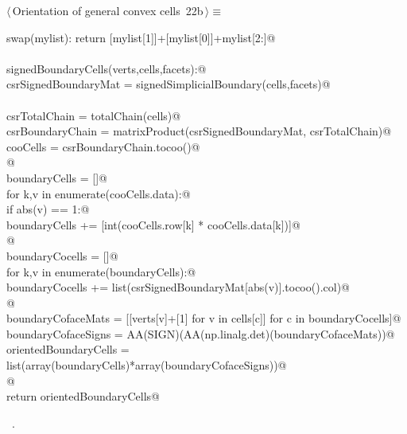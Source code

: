 \documentclass[11pt,oneside]{article}	%
\begin{document}
\begin{flushleft} \small \label{scrap39}
\protect{}$\langle\,$Orientation of general convex cells\nobreak\ {\footnotesize 22b}$\,\rangle\equiv$
\vspace{-1ex}
\begin{list}{}{} \item
\mbox{}\verb@def swap(mylist): return [mylist[1]]+[mylist[0]]+mylist[2:]@\\
\mbox{}\verb@@\\
\mbox{}\verb@def signedBoundaryCells(verts,cells,facets):@\\
\mbox{}\verb@   csrSignedBoundaryMat = signedSimplicialBoundary(cells,facets)@\\
\mbox{}\verb@@\\
\mbox{}\verb@   csrTotalChain = totalChain(cells)@\\
\mbox{}\verb@   csrBoundaryChain = matrixProduct(csrSignedBoundaryMat, csrTotalChain)@\\
\mbox{}\verb@   cooCells = csrBoundaryChain.tocoo()@\\
\mbox{}\verb@   @\\
\mbox{}\verb@   boundaryCells = []@\\
\mbox{}\verb@   for k,v in enumerate(cooCells.data):@\\
\mbox{}\verb@      if abs(v) == 1:@\\
\mbox{}\verb@         boundaryCells += [int(cooCells.row[k] * cooCells.data[k])]@\\
\mbox{}\verb@         @\\
\mbox{}\verb@   boundaryCocells = []@\\
\mbox{}\verb@   for k,v in enumerate(boundaryCells):@\\
\mbox{}\verb@      boundaryCocells += list(csrSignedBoundaryMat[abs(v)].tocoo().col)@\\
\mbox{}\verb@      @\\
\mbox{}\verb@   boundaryCofaceMats = [[verts[v]+[1] for v in cells[c]] for c in boundaryCocells]@\\
\mbox{}\verb@   boundaryCofaceSigns = AA(SIGN)(AA(np.linalg.det)(boundaryCofaceMats))@\\
\mbox{}\verb@   orientedBoundaryCells = list(array(boundaryCells)*array(boundaryCofaceSigns))@\\
\mbox{}\verb@   @\\
\mbox{}\verb@   return orientedBoundaryCells@\\
\mbox{}\verb@@{\NWsep}
\end{list}
\vspace{-1ex}
\footnotesize\addtolength{\baselineskip}{-1ex}
\begin{list}{}{\setlength{\itemsep}{-\parsep}\setlength{\itemindent}{-\leftmargin}}
\item \NWtxtMacroRefIn\ .
\end{list}
\end{flushleft}
\end{document}
